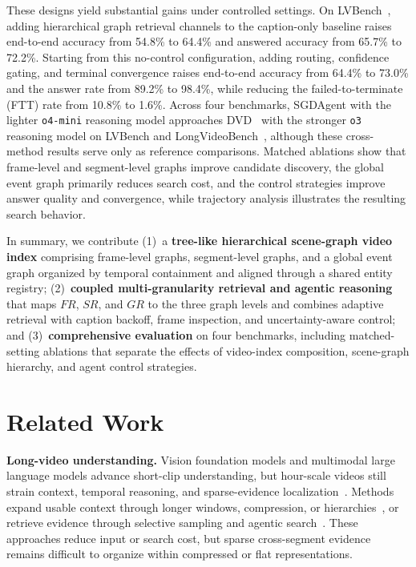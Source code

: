 \documentclass[letterpaper]{article} %
\begin{document}

These designs yield substantial gains under controlled settings.
On LVBench~\cite{lvbench}, adding hierarchical graph retrieval channels to the caption-only baseline raises end-to-end accuracy from 54.8\% to 64.4\% and answered accuracy from 65.7\% to 72.2\%.
Starting from this no-control configuration, adding routing, confidence gating, and terminal convergence raises end-to-end accuracy from 64.4\% to 73.0\% and the answer rate from 89.2\% to 98.4\%, while reducing the failed-to-terminate (FTT) rate from 10.8\% to 1.6\%.
Across four benchmarks, SGDAgent with the lighter \texttt{o4-mini} reasoning model approaches DVD~\cite{deepvideo2025} with the stronger \texttt{o3} reasoning model on LVBench and LongVideoBench~\cite{longvideobench2024}, although these cross-method results serve only as reference comparisons.
Matched ablations show that frame-level and segment-level graphs improve candidate discovery, the global event graph primarily reduces search cost, and the control strategies improve answer quality and convergence, while trajectory analysis illustrates the resulting search behavior.


In summary, we contribute (1)~a \textbf{tree-like hierarchical scene-graph video index} comprising frame-level graphs, segment-level graphs, and a global event graph organized by temporal containment and aligned through a shared entity registry; (2)~\textbf{coupled multi-granularity retrieval and agentic reasoning} that maps $FR$, $SR$, and $GR$ to the three graph levels and combines adaptive retrieval with caption backoff, frame inspection, and uncertainty-aware control; and (3)~\textbf{comprehensive evaluation} on four benchmarks, including matched-setting ablations that separate the effects of video-index composition, scene-graph hierarchy, and agent control strategies.



\section{Related Work}
\label{sec:related}

\textbf{Long-video understanding.}
Vision foundation models and multimodal large language models advance short-clip understanding, but hour-scale videos still strain context, temporal reasoning, and sparse-evidence localization~\cite{radford2021CLIP,li2022GLIP,llava2023,video-llava2024,bai2025qwen3vl,caba2015activitynet,lvbench,longvideobench2024}.
Methods expand usable context through longer windows, compression, or hierarchies~\cite{gemini15,qwen,internvl,seed,longvu2025,shu2025video,apollo2025,wang2025adaretake}, or retrieve evidence through selective sampling and agentic search~\cite{deepvideo2025,mrvideo,videoseek,zhang2024simplellm,videorag2025,videotree2025,drvideo2025,yang2025vca,videoagent,omagent2024}.
These approaches reduce input or search cost, but sparse cross-segment evidence remains difficult to organize within compressed or flat representations.
\end{document}
